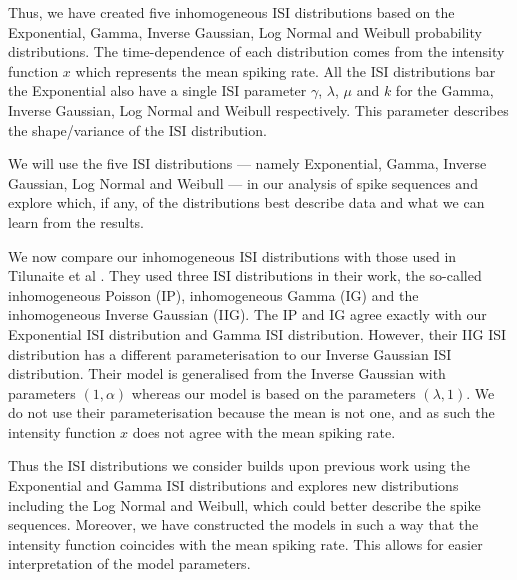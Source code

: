 \documentclass[oneside, 12 pt]{book}
\begin{document}
 
 Thus, we have created five inhomogeneous ISI distributions based on the Exponential, Gamma, Inverse Gaussian, Log Normal and Weibull probability distributions. The time-dependence of each distribution comes from the intensity function $x$ which represents the mean spiking rate. All the ISI distributions bar the Exponential also have a single ISI parameter $\gamma$, $\lambda$, $\mu$ and $k$ for the Gamma, Inverse Gaussian, Log Normal and Weibull respectively. This parameter describes the shape/variance of the ISI distribution. 
 
 We will use the five ISI distributions --- namely Exponential, Gamma, Inverse Gaussian, Log Normal and Weibull  --- in our analysis of  spike sequences and explore which, if any, of the distributions best describe  data and what we can learn from the results.



We now compare our inhomogeneous ISI distributions with those used in Tilunaite et al \cite{AGNE:1}.
 They used three ISI distributions in their work, the so-called inhomogeneous Poisson (IP), inhomogeneous Gamma (IG) and the inhomogeneous Inverse Gaussian (IIG). The IP and IG agree exactly with our Exponential ISI distribution and Gamma ISI distribution. However, their IIG ISI distribution has a different parameterisation to our Inverse Gaussian ISI distribution. Their model is generalised from the Inverse Gaussian with parameters $(1,\alpha)$ whereas our model is based on the parameters $(\lambda ,1)$. We do not use their parameterisation because the mean is not one, and as such the intensity function $x$ does not agree with the mean spiking rate. 

Thus the ISI distributions we consider builds upon previous work using the Exponential and Gamma ISI distributions and explores new distributions including the Log Normal and Weibull, which could better describe the  spike sequences. Moreover, we have constructed the models in such a way that the intensity function coincides with the mean spiking rate. This allows for easier interpretation of the model parameters.



 
\end{document}
